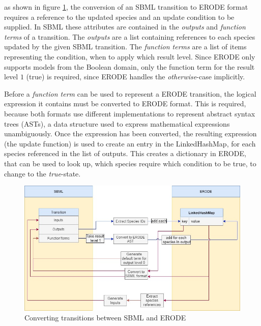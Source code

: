 as shown in figure \ref{fig:transitionConversion}, the conversion of an SBML transition to ERODE format requires a reference to the updated species and an update condition to be supplied. In SBML these attributes are contained in the \emph{outputs} and \emph{function terms} of a transition. The \emph{outputs} are a list containing references to each species updated by the given SBML transition. The \emph{function terms} are a list of items representing the condition, when to apply which result level. Since ERODE only supports models from the Boolean domain, only the function term for the result level $1$ (true) is required, since ERODE handles the \emph{otherwise}-case implicitly. 

Before a \emph{function term} can be used to represent a ERODE transition, the logical expression it contains must be converted to ERODE format. This is required, because both formats use different implementations to represent abstract syntax trees (ASTs), a data structure used to express mathematical expressions unambiguously.
Once the expression has been converted, the resulting expression (the update function) is used to create an entry in the LinkedHashMap, for each species referenced in the list of outputs. This creates a dictionary in ERODE, that can be used to look up, which species require which condition to be true, to change to the \emph{true}-state.

\begin{figure}[H]
    \centering
    \includegraphics[scale=0.45]{Sections/Images/TransitionConversion.jpg}
    \caption{Converting transitions between SBML and ERODE}
    \label{fig:transitionConversion}
\end{figure}

